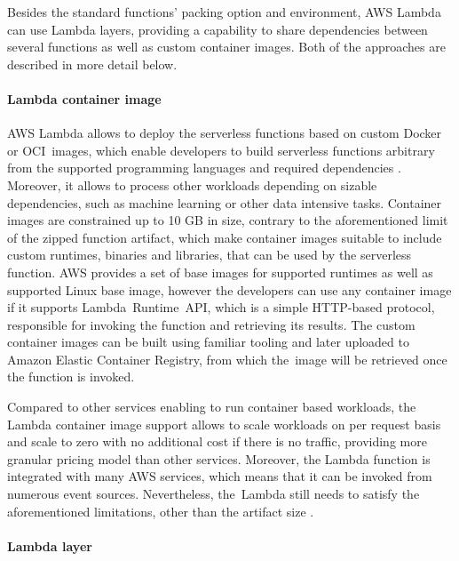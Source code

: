 Besides the standard functions' packing option and environment, AWS Lambda can use Lambda layers, providing a capability to share dependencies between several functions as well as custom container images.
Both of the approaches are described in more detail below.

\paragraph{Lambda container image}

AWS Lambda allows to deploy the serverless functions based on custom Docker or OCI~images, which enable developers to build serverless functions arbitrary from the supported programming languages and required dependencies \cite{AWSLambdaContainerImage}. Moreover, it allows to process other workloads depending on sizable dependencies, such as machine learning or other data intensive tasks.
Container images are constrained up to 10 GB in size, contrary to the aforementioned limit of the zipped function artifact, which make container images suitable to include custom runtimes, binaries and libraries, that can be used by the serverless function.
AWS provides a set of base images for supported runtimes as well as supported Linux base image, however the developers can use any container image if it supports Lambda~Runtime~API, which is a simple HTTP-based protocol, responsible for invoking the function and retrieving its results.
The custom container images can be built using familiar tooling and later uploaded to Amazon Elastic Container Registry, from which the~image will be retrieved once the function is invoked.

Compared to other services enabling to run container based workloads, the Lambda container image support allows to scale workloads on per request basis and scale to zero with no additional cost if there is no traffic, providing more granular pricing model than other services. Moreover, the Lambda function is integrated with many AWS services, which means that it can be invoked from numerous event sources. 
Nevertheless, the~Lambda still needs to satisfy the aforementioned limitations, other than the artifact size \cite{RunningContainerImagesInAWSLambda}.

\paragraph{Lambda layer}

